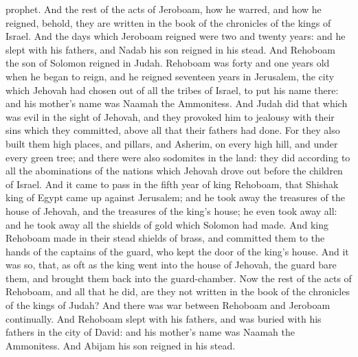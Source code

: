 prophet.  And the rest of the acts of Jeroboam, how he warred, and how he reigned, behold, they are written in the book of the chronicles of the kings of Israel. And the days which Jeroboam reigned were two and twenty years: and he slept with his fathers, and Nadab his son reigned in his stead.  And Rehoboam the son of Solomon reigned in Judah. Rehoboam was forty and one years old when he began to reign, and he reigned seventeen years in Jerusalem, the city which Jehovah had chosen out of all the tribes of Israel, to put his name there: and his mother’s name was Naamah the Ammonitess. And Judah did that which was evil in the sight of Jehovah, and they provoked him to jealousy with their sins which they committed, above all that their fathers had done. For they also built them high places, and pillars, and Asherim, on every high hill, and under every green tree; and there were also sodomites in the land: they did according to all the abominations of the nations which Jehovah drove out before the children of Israel.  And it came to pass in the fifth year of king Rehoboam, that Shishak king of Egypt came up against Jerusalem; and he took away the treasures of the house of Jehovah, and the treasures of the king’s house; he even took away all: and he took away all the shields of gold which Solomon had made. And king Rehoboam made in their stead shields of brass, and committed them to the hands of the captains of the guard, who kept the door of the king’s house. And it was so, that, as oft as the king went into the house of Jehovah, the guard bare them, and brought them back into the guard-chamber.  Now the rest of the acts of Rehoboam, and all that he did, are they not written in the book of the chronicles of the kings of Judah? And there was war between Rehoboam and Jeroboam continually. And Rehoboam slept with his fathers, and was buried with his fathers in the city of David: and his mother’s name was Naamah the Ammonitess. And Abijam his son reigned in his stead. 

